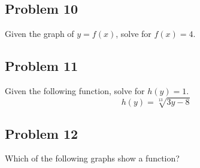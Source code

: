 \documentclass[12pt]{article}
\begin{document}
\subsection*{Problem 10}
Given the graph of \( y = f(x) \), solve for \( f(x) = 4 \).

    \begin{center}
    \end{center}



\subsection*{Problem 11}
Given the following function, solve for \(h(y)=1\).
\[ h(y)=\sqrt[13]{3y-8}\]

\subsection*{Problem 12}
Which of the following graphs show a function?
\end{document}
